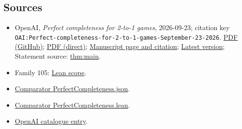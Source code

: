 \documentclass[11pt]{article}
\begin{document}
\subsection{Sources}
\begin{itemize}
\item OpenAI, \emph{Perfect completeness for 2-to-1 games}, 2026-09-23; citation key \texttt{OAI:Perfect-completeness-for-2-to-1-games-September-23-2026}. \href{https://github.com/openai/math/blob/adc7f1241b42e322a6451854ab7e4b4c146bf78a/preprints/Perfect-completeness-for-2-to-1-games-September-23-2026/paper.pdf}{PDF (GitHub)}; \href{https://github.com/openai/math/raw/adc7f1241b42e322a6451854ab7e4b4c146bf78a/preprints/Perfect-completeness-for-2-to-1-games-September-23-2026/paper.pdf}{PDF (direct)}; \href{https://github.com/openai/math/blob/adc7f1241b42e322a6451854ab7e4b4c146bf78a/preprints/Perfect-completeness-for-2-to-1-games-September-23-2026/README.md}{Manuscript page and citation}; \href{https://github.com/openai/math/blob/main/preprints/Perfect-completeness-for-2-to-1-games-September-23-2026/paper.pdf}{Latest version}; Statement source: \href{https://github.com/openai/math/blob/adc7f1241b42e322a6451854ab7e4b4c146bf78a/preprints/Perfect-completeness-for-2-to-1-games-September-23-2026/build/00-introduction.tex\#L32}{thm:main}.
\item Family 105: \href{https://github.com/openai/math/blob/adc7f1241b42e322a6451854ab7e4b4c146bf78a/lean/docs/105.md}{Lean scope}.
\item \href{https://github.com/openai/math/blob/adc7f1241b42e322a6451854ab7e4b4c146bf78a/lean/ComparatorChallenges/PerfectCompleteness.json}{Comparator PerfectCompleteness.json}.
\item \href{https://github.com/openai/math/blob/adc7f1241b42e322a6451854ab7e4b4c146bf78a/lean/ComparatorChallenges/PerfectCompleteness.lean}{Comparator PerfectCompleteness.lean}.
\item \href{https://github.com/openai/math/blob/adc7f1241b42e322a6451854ab7e4b4c146bf78a/CONTENTS.md}{OpenAI catalogue entry}.
\end{itemize}
\end{document}
